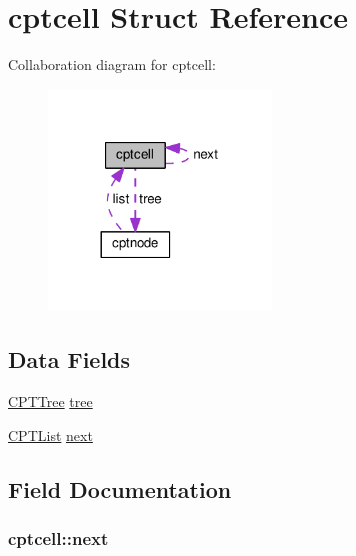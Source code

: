 \hypertarget{structcptcell}{}\section{cptcell Struct Reference}
\label{structcptcell}


Collaboration diagram for cptcell\+:\nopagebreak
\begin{figure}[H]
\begin{center}
\leavevmode
\includegraphics[width=168pt]{structcptcell__coll__graph}
\end{center}
\end{figure}
\subsection*{Data Fields}
\begin{DoxyCompactItemize}
\item 
\hyperlink{cpt__string_8c_ab66488a4813896c44d2e4bbcf8d43a86}{C\+P\+T\+Tree} \hyperlink{structcptcell_a8ce1e2723947c6ebce10520f1fcee6be}{tree}
\item 
\hyperlink{cpt__string_8c_ab32bc138599911e22c2be201414b53e7}{C\+P\+T\+List} \hyperlink{structcptcell_a20fc8bb9280bb623be1dc9e5089df7bb}{next}
\end{DoxyCompactItemize}


\subsection{Field Documentation}
\subsubsection[{\texorpdfstring{next}{next}}]{ cptcell\+::next}\hypertarget{structcptcell_a20fc8bb9280bb623be1dc9e5089df7bb}{}\label{structcptcell_a20fc8bb9280bb623be1dc9e5089df7bb}
